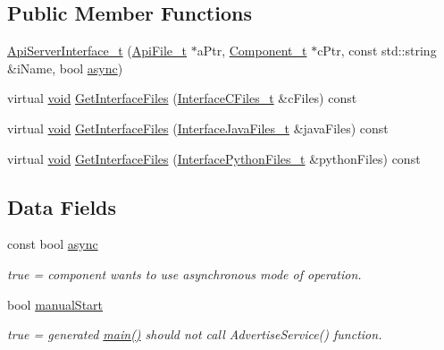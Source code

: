 \subsection*{Public Member Functions}
\begin{DoxyCompactItemize}
\item 
\hyperlink{structmodel_1_1_api_server_interface__t_ae332b5cb46edf97a75a17d45a5f382cc}{Api\+Server\+Interface\+\_\+t} (\hyperlink{structmodel_1_1_api_file__t}{Api\+File\+\_\+t} $\ast$a\+Ptr, \hyperlink{structmodel_1_1_component__t}{Component\+\_\+t} $\ast$c\+Ptr, const std\+::string \&i\+Name, bool \hyperlink{structmodel_1_1_api_server_interface__t_a35660898c6791e12a0122d8a6bd690e1}{async})
\item 
virtual \hyperlink{_t_e_m_p_l_a_t_e__cdef_8h_ac9c84fa68bbad002983e35ce3663c686}{void} \hyperlink{structmodel_1_1_api_server_interface__t_a1186f6b6437d234c475ad59af7d111e8}{Get\+Interface\+Files} (\hyperlink{structmodel_1_1_interface_c_files__t}{Interface\+C\+Files\+\_\+t} \&c\+Files) const 
\item 
virtual \hyperlink{_t_e_m_p_l_a_t_e__cdef_8h_ac9c84fa68bbad002983e35ce3663c686}{void} \hyperlink{structmodel_1_1_api_server_interface__t_a10a88c45782a0e43b8813545e96c7cef}{Get\+Interface\+Files} (\hyperlink{structmodel_1_1_interface_java_files__t}{Interface\+Java\+Files\+\_\+t} \&java\+Files) const 
\item 
virtual \hyperlink{_t_e_m_p_l_a_t_e__cdef_8h_ac9c84fa68bbad002983e35ce3663c686}{void} \hyperlink{structmodel_1_1_api_server_interface__t_a3ace0bcce2bfd5a9d10439b401aea3b2}{Get\+Interface\+Files} (\hyperlink{structmodel_1_1_interface_python_files__t}{Interface\+Python\+Files\+\_\+t} \&python\+Files) const 
\end{DoxyCompactItemize}
\subsection*{Data Fields}
\begin{DoxyCompactItemize}
\item 
const bool \hyperlink{structmodel_1_1_api_server_interface__t_a35660898c6791e12a0122d8a6bd690e1}{async}
\begin{DoxyCompactList}\small\item\em true = component wants to use asynchronous mode of operation. \end{DoxyCompactList}\item 
bool \hyperlink{structmodel_1_1_api_server_interface__t_a197872d1a9fc3af208e897af61012eca}{manual\+Start}
\begin{DoxyCompactList}\small\item\em true = generated \hyperlink{start_8c_a3c04138a5bfe5d72780bb7e82a18e627}{main()} should not call Advertise\+Service() function. \end{DoxyCompactList}\end{DoxyCompactItemize}
